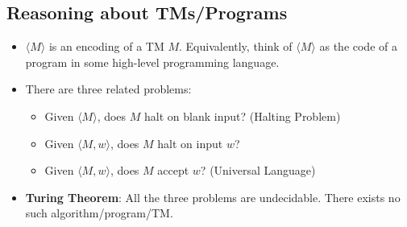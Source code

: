 \subsection{Reasoning about TMs/Programs}
\begin{itemize}
    \item $\langle M \rangle$ is an encoding of a TM $M$. Equivalently, think of $\langle M \rangle$ as the code of a program in some high-level programming language.
    \item There are three related problems:
    \begin{itemize}
        \item Given $\langle M \rangle$, does $M$ halt on blank input? (Halting Problem)
        \item Given $\langle M, w \rangle$, does $M$ halt on input $w$?
        \item Given $\langle M, w \rangle$, does $M$ accept $w$? (Universal Language)
    \end{itemize}
    \item \textbf{Turing Theorem}: All the three problems are undecidable. There exists no such algorithm/program/TM.
\end{itemize}
